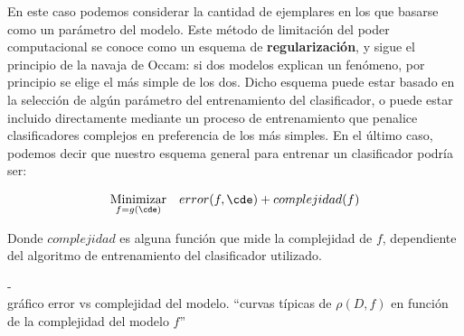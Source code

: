 En este caso podemos considerar la cantidad de ejemplares en los que basarse como un parámetro del modelo. Este método de limitación del poder computacional se conoce como un esquema de \textbf{regularización}, y sigue el principio de la navaja de Occam: si dos modelos explican un fenómeno, por principio se elige el más simple de los dos. Dicho esquema puede estar basado en la selección de algún parámetro del entrenamiento del clasificador, o puede estar incluido directamente mediante un proceso de entrenamiento que penalice clasificadores complejos en preferencia de los más simples. En el último caso, podemos decir que nuestro esquema general para entrenar un clasificador podría ser:

\begin{equation*}
\begin{aligned}
\underset{f=g(\cde)}{\text{Minimizar}} & & error(f,\cde) + complejidad(f) 
\end{aligned}
\end{equation*}

Donde $complejidad$ es alguna función que mide la complejidad de $f$, dependiente del algoritmo de entrenamiento del clasificador utilizado.


-\\gráfico error vs complejidad del modelo.
``curvas típicas de $\rho(D,f)$ en función de la complejidad del modelo $f$''\\



